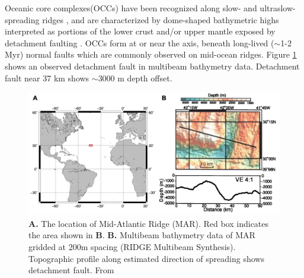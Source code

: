 \documentclass[letterpaper,12pt,notitle]{memphisthesis}                     %
\begin{document}
Oceanic core complexes(OCCs) have been recognized along slow- and ultraslow- spreading ridges \citep{Tucholke1998}, and are characterized by dome-shaped bathymetric highs interpreted as portions of the lower crust and/or upper mantle exposed by detachment faulting \citep{Tucholke1994}. OCCs form at or near the axis, beneath long-lived ($\sim$1-2 Myr) normal faults which are commonly observed on mid-ocean ridges. Figure \ref{fig:occ} shows an observed detachment fault in multibeam bathymetry data. Detachment fault near 37 km shows $\sim$3000 m depth offset.
%
\begin{figure}[!htb]
	\centering
	\includegraphics[width=0.9\linewidth,trim=4 4 4 4,clip]{./figs/occ.png}
	\caption{\textbf{A.} The location of Mid-Atlantic Ridge (MAR). Red box indicates the area shown in \textbf{B}. \textbf{B.} Multibeam bathymetry data of MAR gridded at 200m spacing (RIDGE Multibeam Synthesis). Topographic profile along estimated direction of spreading shows detachment fault. From \citet{Lavier2000}}
	\label{fig:occ}
\end{figure}
%
\end{document}
